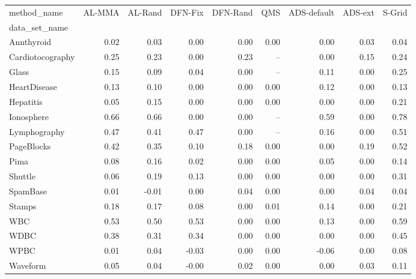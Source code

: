 \begin{tabular}{lrrrrrrrr}
\toprule
method\_name &  AL-MMA &  AL-Rand &  DFN-Fix &  DFN-Rand &  QMS &  ADS-default &  ADS-ext &  S-Grid \\
data\_set\_name    &         &          &          &           &      &              &          &         \\
\midrule
Annthyroid       &    0.02 &     0.03 &     0.00 &      0.00 & 0.00 &         0.00 &     0.03 &    0.04 \\
Cardiotocography &    0.25 &     0.23 &     0.00 &      0.23 &   -- &         0.00 &     0.15 &    0.24 \\
Glass            &    0.15 &     0.09 &     0.04 &      0.00 &   -- &         0.11 &     0.00 &    0.25 \\
HeartDisease     &    0.13 &     0.10 &     0.00 &      0.00 & 0.00 &         0.12 &     0.00 &    0.13 \\
Hepatitis        &    0.05 &     0.15 &     0.00 &      0.00 & 0.00 &         0.00 &     0.00 &    0.21 \\
Ionosphere       &    0.66 &     0.66 &     0.00 &      0.00 &   -- &         0.59 &     0.00 &    0.78 \\
Lymphography     &    0.47 &     0.41 &     0.47 &      0.00 &   -- &         0.16 &     0.00 &    0.51 \\
PageBlocks       &    0.42 &     0.35 &     0.10 &      0.18 & 0.00 &         0.00 &     0.19 &    0.52 \\
Pima             &    0.08 &     0.16 &     0.02 &      0.00 & 0.00 &         0.05 &     0.00 &    0.14 \\
Shuttle          &    0.06 &     0.19 &     0.13 &      0.00 & 0.00 &         0.00 &     0.00 &    0.31 \\
SpamBase         &    0.01 &    -0.01 &     0.00 &      0.04 & 0.00 &         0.00 &     0.04 &    0.04 \\
Stamps           &    0.18 &     0.17 &     0.08 &      0.00 & 0.01 &         0.14 &     0.00 &    0.21 \\
WBC              &    0.53 &     0.50 &     0.53 &      0.00 & 0.00 &         0.13 &     0.00 &    0.59 \\
WDBC             &    0.38 &     0.31 &     0.34 &      0.00 & 0.00 &         0.00 &     0.00 &    0.45 \\
WPBC             &    0.01 &     0.04 &    -0.03 &      0.00 & 0.00 &        -0.06 &     0.00 &    0.08 \\
Waveform         &    0.05 &     0.04 &    -0.00 &      0.02 & 0.00 &         0.00 &     0.03 &    0.11 \\
\bottomrule
\end{tabular}
